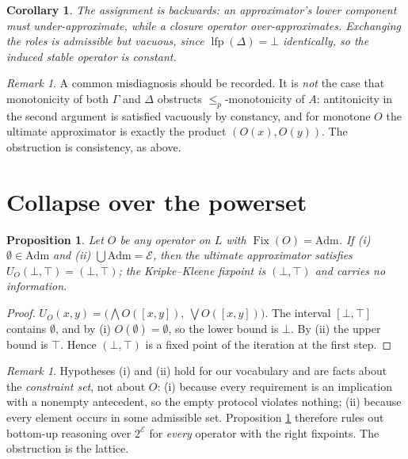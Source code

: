 \documentclass[11pt]{article}
\theoremstyle{definition}
\theoremstyle{plain}
\newtheorem{proposition}[definition]{Proposition}
\newtheorem{corollary}[definition]{Corollary}
\theoremstyle{remark}
\newtheorem{remark}[definition]{Remark}
\newcommand{\Adm}{\mathrm{Adm}}
\newcommand{\Fix}{\operatorname{Fix}}
\newcommand{\lfp}{\operatorname{lfp}}
\newcommand{\El}{\mathcal{E}}
\begin{document}
\begin{corollary}
The assignment is backwards: an approximator's lower component must
\emph{under}-approximate, while a closure operator \emph{over}-approximates.
Exchanging the roles is admissible but vacuous, since $\lfp(\Delta) = \bot$
identically, so the induced stable operator is constant.
\end{corollary}

\begin{remark}
A common misdiagnosis should be recorded. It is \emph{not} the case that
monotonicity of both $\Gamma$ and $\Delta$ obstructs $\le_p$-monotonicity of $A$:
antitonicity in the second argument is satisfied vacuously by constancy, and for
monotone $O$ the ultimate approximator is exactly the product
$(O(x), O(y))$. The obstruction is consistency, as above.
\end{remark}

\section{Collapse over the powerset}

\begin{proposition}\label{prop:collapse}
Let $O$ be any operator on $L$ with $\Fix(O) = \Adm$. If
\emph{(i)} $\emptyset \in \Adm$ and \emph{(ii)} $\bigcup \Adm = \El$, then the
ultimate approximator satisfies $U_O(\bot,\top) = (\bot,\top)$; the
Kripke--Kleene fixpoint is $(\bot,\top)$ and carries no information.
\end{proposition}

\begin{proof}
$U_O(x,y) = \bigl(\bigwedge O([x,y]),\ \bigvee O([x,y])\bigr)$. The interval
$[\bot,\top]$ contains $\emptyset$, and by (i) $O(\emptyset) = \emptyset$, so the
lower bound is $\bot$. By (ii) the upper bound is $\top$. Hence
$(\bot,\top)$ is a fixed point of the iteration at the first step.
\end{proof}

\begin{remark}
Hypotheses (i) and (ii) hold for our vocabulary and are facts about the
\emph{constraint set}, not about $O$: (i) because every requirement is an
implication with a nonempty antecedent, so the empty protocol violates nothing;
(ii) because every element occurs in some admissible set. Proposition
\ref{prop:collapse} therefore rules out bottom-up reasoning over $2^{\El}$ for
\emph{every} operator with the right fixpoints. The obstruction is the lattice.
\end{remark}
\end{document}
